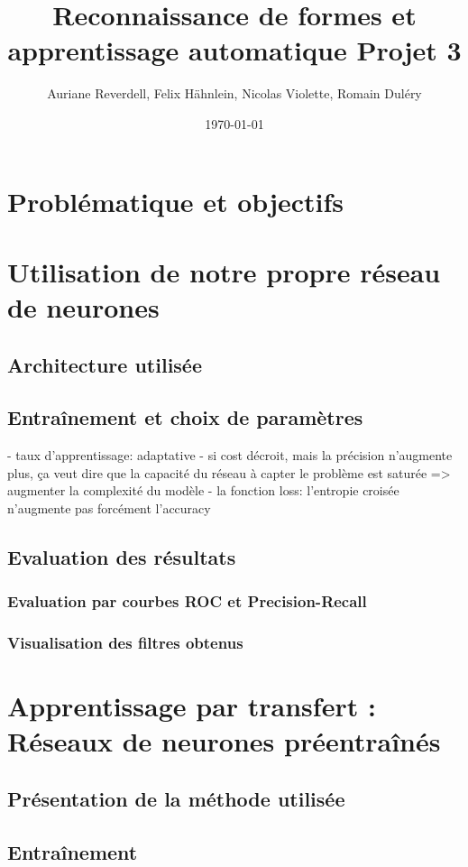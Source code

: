 \documentclass[a4paper,11pt]{article}
\title{Reconnaissance de formes et apprentissage automatique Projet 3}
\author{Auriane Reverdell, Felix Hähnlein, Nicolas Violette, Romain Duléry}
\date{\today}
\begin{document}
\maketitle
\vspace{1cm}

\section{Problématique et objectifs}

\section{Utilisation de notre propre réseau de neurones}
\subsection{Architecture utilisée}
\subsection{Entraînement et choix de paramètres}
- taux d'apprentissage: adaptative
- si cost décroit, mais la précision n'augmente plus, ça veut dire que la capacité du réseau à capter le problème est saturée => augmenter la complexité du modèle
- la fonction loss: l'entropie croisée n'augmente pas forcément l'accuracy
\subsection{Evaluation des résultats}
\subsubsection{Evaluation par courbes ROC et Precision-Recall}
\subsubsection{Visualisation des filtres obtenus}

\section{Apprentissage par transfert : Réseaux de neurones préentraînés}
\subsection{Présentation de la méthode utilisée}
\subsection{Entraînement}
\end{document}

